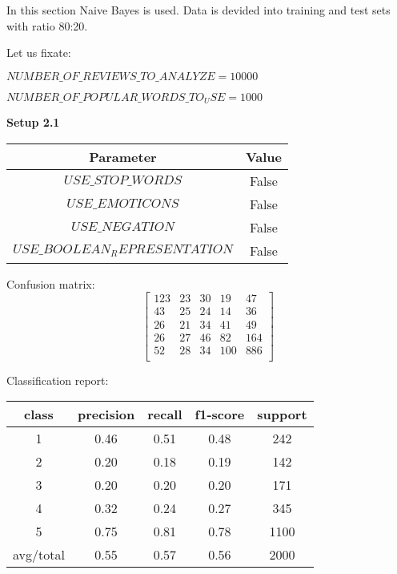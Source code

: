 \documentclass[12pt]{report}
\begin{document}
In this section Naive Bayes is used. Data is devided into training and test sets with ratio 80:20.

Let us fixate:

$NUMBER\_OF\_REVIEWS\_TO\_ANALYZE = 10000$

$NUMBER\_OF\_POPULAR\_WORDS\_TO_USE = 1000$

\bigbreak

\textbf{Setup 2.1}

\begin{center}
	\begin{tabular}{ c | c }
		\hline
		Parameter & Value \\ \hline
		$USE\_STOP\_WORDS$ & False \\ \hline
		$USE\_EMOTICONS$ & False \\ \hline
		$USE\_NEGATION$ & False \\ \hline
		$USE\_BOOLEAN_REPRESENTATION$ & False \\ \hline
	\end{tabular}
\end{center}

Confusion matrix:
\[
\begin{bmatrix}
123 & 23 & 30 & 19 & 47 \\
43 & 25 & 24 & 14 & 36 \\
26 & 21 & 34 & 41 & 49 \\
26 & 27 & 46 & 82 & 164 \\
52 & 28 & 34 & 100 & 886 \\
\end{bmatrix}
\]

Classification report:

\begin{center}
	\begin{tabular}{c | c | c | c | c }
		\hline
		class & precision & recall & f1-score & support \\ \hline
		1 & 0.46 & 0.51 & 0.48 & 242 \\ \hline
		2 & 0.20 & 0.18 & 0.19 & 142 \\ \hline
		3 & 0.20 & 0.20 & 0.20 & 171 \\ \hline
		4 & 0.32 & 0.24 & 0.27 & 345 \\ \hline
		5 & 0.75 & 0.81 & 0.78 & 1100 \\ \hline
		avg/total & 0.55 & 0.57 & 0.56 & 2000 \\ \hline
	\end{tabular}
\end{center}
\end{document}

